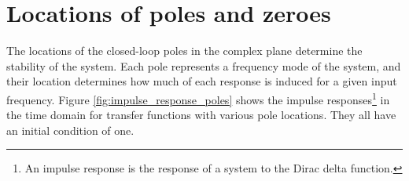 \section{Locations of poles and zeroes}

The locations of the closed-loop poles in the complex plane determine the
stability of the \gls{system}. Each pole represents a frequency mode of the
\gls{system}, and their location determines how much of each response is induced
for a given input frequency. Figure \ref{fig:impulse_response_poles} shows the
impulse responses\footnote{An impulse response is the response of a \gls{system}
to the Dirac delta function.} in the time domain for transfer functions with
various pole locations. They all have an initial condition of one.

\begin{bookfigure}
\end{bookfigure}
